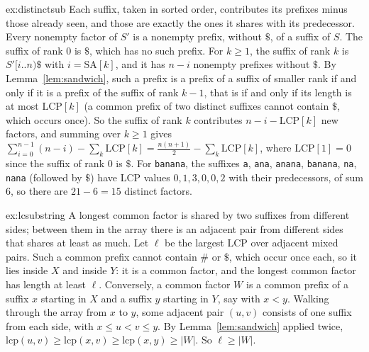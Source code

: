 \begin{solution}{ex:distinctsub}
\idea Each suffix, taken in sorted order, contributes its prefixes minus those already seen, and those are exactly the ones it shares with its predecessor.
\writeup Every nonempty factor of $S'$ is a nonempty prefix, without $\$$, of a suffix of $S$. The suffix of rank $0$ is $\$$, which has no such prefix. For $k\ge1$, the suffix of rank $k$ is $S'[i..n)\$$ with $i=\mathrm{SA}[k]$, and it has $n-i$ nonempty prefixes without $\$$. By Lemma~\ref{lem:sandwich}, such a prefix is a prefix of a suffix of smaller rank if and only if it is a prefix of the suffix of rank $k-1$, that is if and only if its length is at most $\mathrm{LCP}[k]$ (a common prefix of two distinct suffixes cannot contain $\$$, which occurs once).
So the suffix of rank $k$ contributes $n-i-\mathrm{LCP}[k]$ new factors, and summing over $k\ge1$ gives $\sum_{i=0}^{n-1}(n-i)-\sum_k\mathrm{LCP}[k]=\frac{n(n+1)}2-\sum_k\mathrm{LCP}[k]$, where $\mathrm{LCP}[1]=0$ since the suffix of rank $0$ is $\$$. For \texttt{banana}, the suffixes \texttt{a}, \texttt{ana}, \texttt{anana}, \texttt{banana}, \texttt{na}, \texttt{nana} (followed by $\$$) have LCP values $0,1,3,0,0,2$ with their predecessors, of sum $6$, so there are $21-6=15$ distinct factors.
\end{solution}

\begin{solution}{ex:lcsubstring}
\idea A longest common factor is shared by two suffixes from different sides; between them in the array there is an adjacent pair from different sides that shares at least as much.
\writeup Let $\ell$ be the largest LCP over adjacent mixed pairs. Such a common prefix cannot contain $\#$ or $\$$, which occur once each, so it lies inside $X$ and inside $Y$: it is a common factor, and the longest common factor has length at least $\ell$. Conversely, a common factor $W$ is a common prefix of a suffix $x$ starting in $X$ and a suffix $y$ starting in $Y$, say with $x<y$. Walking through the array from $x$ to $y$, some adjacent pair $(u,v)$ consists of one suffix from each side, with $x\le u<v\le y$.
By Lemma~\ref{lem:sandwich} applied twice, $\mathrm{lcp}(u,v)\ge\mathrm{lcp}(x,v)\ge\mathrm{lcp}(x,y)\ge|W|$. So $\ell\ge|W|$.
\end{solution}

